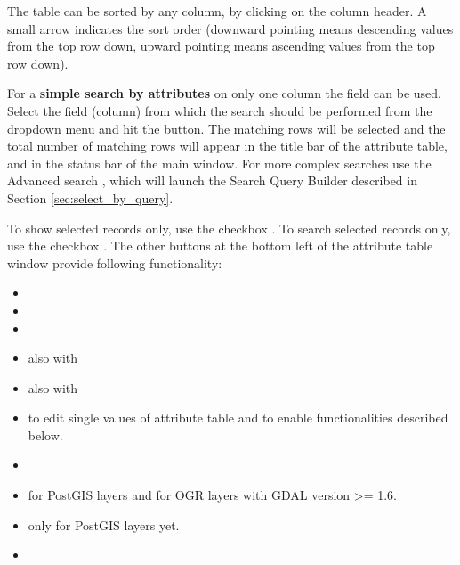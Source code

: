 The table can be sorted by any column, by clicking on the column header. A small
arrow indicates the sort order (downward pointing means descending values from the
top row down, upward pointing means ascending values from the top row down).

For a \textbf{simple search by attributes} on only one column the 
field can be used. Select the field (column) from which the search should be
performed from the dropdown menu and hit the  button. The matching
rows will be selected and the total number of
matching rows will appear in the title bar of the attribute table, and in the
status bar of the main window. For more complex searches use
the Advanced search , which will launch the Search Query Builder
described in Section \ref{sec:select_by_query}.

To show selected records only, use the checkbox . To search selected records only, use the checkbox . The other buttons at the bottom left of the attribute table window provide following functionality:

\begin{itemize}[label=--]
\item {}
\item {}
\item {}
\item {} also with 
\item {} also with 
\item {} to edit single values
of attribute table and to enable functionalities described below.
\item {}
\item {} for PostGIS layers and for OGR layers with GDAL version >= 1.6.
\item {} only for PostGIS layers yet.
\item {}
\end{itemize}

